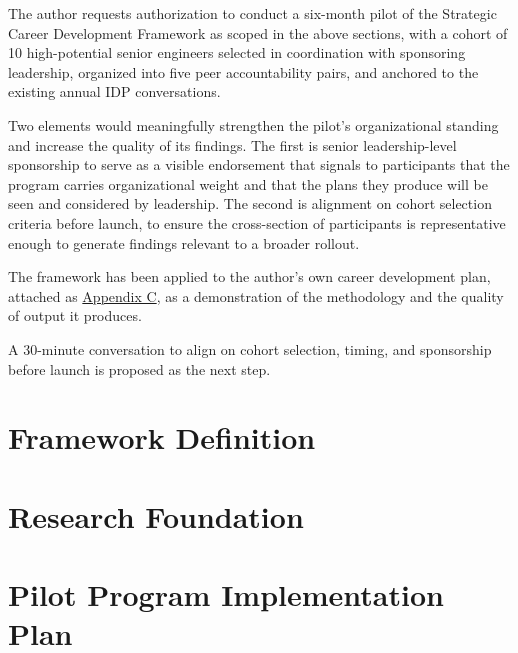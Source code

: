 \documentclass{article}
\begin{document}
The author requests authorization to conduct a six-month pilot of the Strategic
Career Development Framework as scoped in the above sections, with a cohort of 10
high-potential senior engineers selected in coordination with sponsoring leadership,
organized into five peer accountability pairs, and anchored to the existing
annual IDP conversations.

Two elements would meaningfully strengthen the pilot's organizational standing
and increase the quality of its findings. The first is senior leadership-level sponsorship 
to serve as a visible endorsement that signals to participants that the program 
carries organizational weight and that the plans they produce will be seen and 
considered by leadership. The second is alignment on cohort selection criteria before launch,
to ensure the cross-section of participants is representative enough to generate findings 
relevant to a broader rollout.

The framework has been applied to the author's own career development plan,
attached as \hyperref[AppendixC]{Appendix C}, as a demonstration of the methodology and the quality
of output it produces.

A 30-minute conversation to align on cohort selection, timing, and sponsorship
before launch is proposed as the next step.

\newpage
\appendix

\section{Framework Definition}
\label{AppendixA}

\newpage
\section{Research Foundation}
\label{AppendixB}

%

\newpage
\section{Pilot Program Implementation Plan}
\label{AppendixD}

% 
\end{document}
